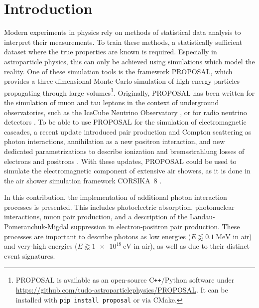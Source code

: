 \section{Introduction}

Modern experiments in physics rely on methods of statistical data analysis to interpret their measurements.
To train these methods, a statistically sufficient dataset where the true properties are known is required.
Especially in astroparticle physics, this can only be achieved using simulations which model the reality.
One of these simulation tools is the framework PROPOSAL, which provides a three-dimensional Monte Carlo simulation of high-energy particles propagating through large volumes\footnote{PROPOSAL is available as an open-source C\texttt{++}/Python software under \url{https://github.com/tudo-astroparticlephysics/PROPOSAL}. It can be installed with \texttt{pip install proposal} or via CMake.}.
Originally, PROPOSAL has been written for the simulation of muon and tau leptons in the context of underground observatories, such as the IceCube Neutrino Observatory \cite{IceCube:2021uhz}, or for radio neutrino detectors \cite{PhysRevD.102.083011}.
To be able to use PROPOSAL for the simulation of electromagnetic cascades, a recent update introduced pair production and Compton scattering as photon interactions, annihilation as a new positron interaction, and new dedicated parametrizations to describe ionization and bremsstrahlung losses of electrons and positrons \cite{Alameddine:2021iq}.
With these updates, PROPOSAL could be used to simulate the electromagnetic component of extensive air showers, as it is done in the air shower simulation framework CORSIKA~8 \cite{icrc2023}. 

In this contribution, the implementation of additional photon interaction processes is presented.
This includes photoelectric absorption, photonuclear interactions, muon pair production, and a description of the Landau-Pomeranchuk-Migdal suppression in electron-positron pair production.
These processes are important to describe photons as low energies ($E \lessapprox \SI{0.1}{\mega\electronvolt}$ in air) and very-high energies ($E \gtrapprox \SI{1e18}{\electronvolt}$ in air), as well as due to their distinct event signatures.